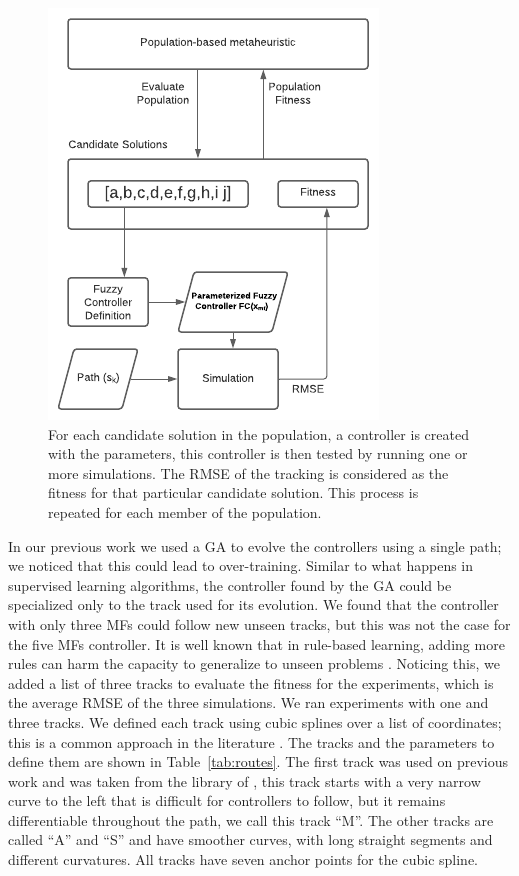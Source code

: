 \documentclass[symmetry,article,submit,moreauthors,pdftex]{Definitions/mdpi}
\begin{document}
\begin{figure}[H]
\centering
\includegraphics[width=9 cm]{img/ga}
\caption{
For each candidate solution in the population, a controller is created with the
parameters, this controller is then tested by running one or more simulations.
The RMSE of the tracking is considered as the fitness for that particular
candidate solution. This process is repeated for each member of the
population.
}\label{fig:ga}
\end{figure} 

In our previous work \cite{Mancilla2021} we used a GA to evolve the controllers 
using a single path; we noticed that this could lead to over-training. Similar to what
happens in supervised learning algorithms, the controller found by the GA could
be specialized only to the track used for its evolution. We found that the
controller with only three MFs could follow new unseen tracks, but this was not
the case for the five MFs controller. It is well known that in rule-based
learning, adding more rules can harm the capacity to generalize to unseen
problems \cite{tan2016introduction}. Noticing this, we added a list of three
tracks to evaluate the fitness for the experiments, which is the average RMSE
of the three simulations. We ran experiments with one and three tracks. We
defined each track using cubic splines over a list of coordinates; this is a
common approach in the literature \cite{zhang2013cubic}. The tracks and the
parameters to define them are shown in Table~\ref{tab:routes}. The first track
was used on previous work and was taken from the library of
\cite{sakai_pythonrobotics_2018}, this track starts with a very narrow curve to
the left that is difficult for controllers to follow, but it remains
differentiable throughout the path, we call this track ``M''. The other tracks
are called ``A'' and ``S'' and have smoother curves, with long straight
segments and different curvatures. All tracks have seven anchor points for the
cubic spline.
\end{document}
